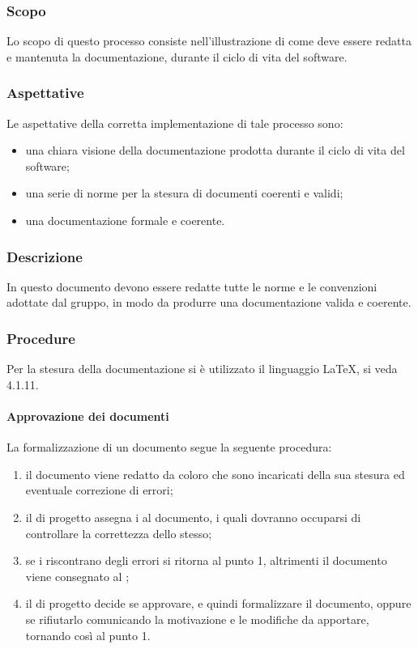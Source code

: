 \subsubsection{Scopo}
Lo scopo di questo processo consiste nell'illustrazione di come deve essere redatta e mantenuta
la documentazione, durante il ciclo di vita del software.
\subsubsection{Aspettative}
Le aspettative della corretta implementazione di tale processo sono:
\begin{itemize}
	\item una chiara visione della documentazione prodotta durante il ciclo di vita
del software;
	\item una serie di norme per la stesura di documenti coerenti e validi;
	\item una documentazione formale e coerente.
\end{itemize}
\subsubsection{Descrizione}
In questo documento devono essere redatte tutte le norme e le convenzioni adottate dal gruppo,
in modo da produrre una documentazione valida e coerente.
\subsubsection{Procedure}
Per la stesura della documentazione si è utilizzato il linguaggio \LaTeX, si veda 4.1.11.
 \paragraph{Approvazione dei documenti}
La formalizzazione di un documento segue la seguente procedura:
\begin{enumerate}
	\item il documento viene redatto da coloro che sono incaricati della sua stesura ed eventuale correzione di errori;
	\item il \RESP{} di progetto assegna i \VERP al documento, i quali dovranno occuparsi di controllare la correttezza dello stesso;
	\item se i \VERP riscontrano degli errori si ritorna al punto 1, altrimenti il documento viene consegnato al \RESP ;
	\item il \RESP{} di progetto decide se approvare, e quindi formalizzare il documento, oppure se rifiutarlo comunicando la motivazione e le modifiche da apportare, tornando così al punto 1.
\end{enumerate}

